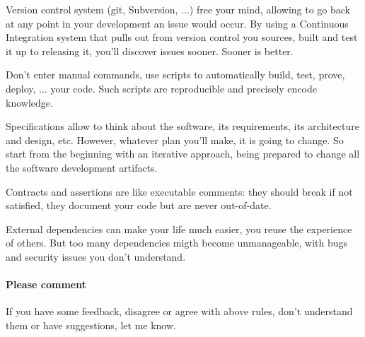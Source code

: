 \documentclass[a4paper]{article}
\newcounter{RuleNumber}
\newcommand{\Rule}{Rule \theRuleNumber:\stepcounter{RuleNumber}}
\begin{document}
\begin{description}
  Version control system (git, Subversion, ...) free your mind, allowing
  to go back at any point in your development an issue would occur. By
  using a Continuous Integration system that pulls out from version
  control you sources, built and test it up to releasing it, you'll
  discover issues sooner. Sooner is better.

\item[\Rule{} Automate everything]

  Don't enter manual commands, use scripts to automatically build, test,
  prove, deploy, ... your code. Such scripts are reproducible and
  precisely encode knowledge.

\item[\Rule{} Specify but use iterative development]

  Specifications allow to think about the software, its requirements,
  its architecture and design, etc. However, whatever plan you'll make,
  it is going to change. So start from the beginning with an iterative
  approach, being prepared to change all the software development
  artifacts.

\item[\Rule{} Use contracts and assertions]

  Contracts and assertions are like executable comments: they should
  break if not satisfied, they document your code but are never
  out-of-date.

\item[\Rule{} Use minimal dependencies but don't reinvent the wheel]

  External dependencies can make your life much easier, you reuse the
  experience of others. But too many dependencies migth become
  unmanageable, with bugs and security issues you don't understand.

\end{description}

\paragraph{Please comment} If you have some feedback, disagree or agree
with above rules, don't understand them or have suggestions, let me
know.
\end{document}
